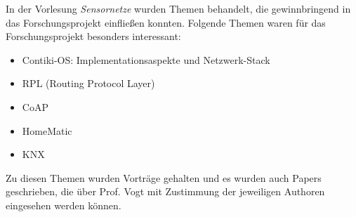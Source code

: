
%

{}



	In der Vorlesung \emph{Sensornetze}
	wurden Themen behandelt, die gewinnbringend in das Forschungsprojekt
	einfließen konnten.
	Folgende Themen waren für das Forschungsprojekt besonders interessant:
	\begin{itemize}
	\item 	Contiki-OS: Implementationsaspekte und Netzwerk-Stack
	\item 	RPL (Routing Protocol Layer)
	\item 	CoAP
	\item 	HomeMatic
	\item 	KNX
	\end{itemize}
	Zu diesen Themen wurden Vorträge gehalten und es wurden auch
	Papers geschrieben, die über Prof. Vogt mit Zustimmung der jeweiligen
	Authoren eingesehen werden können.


